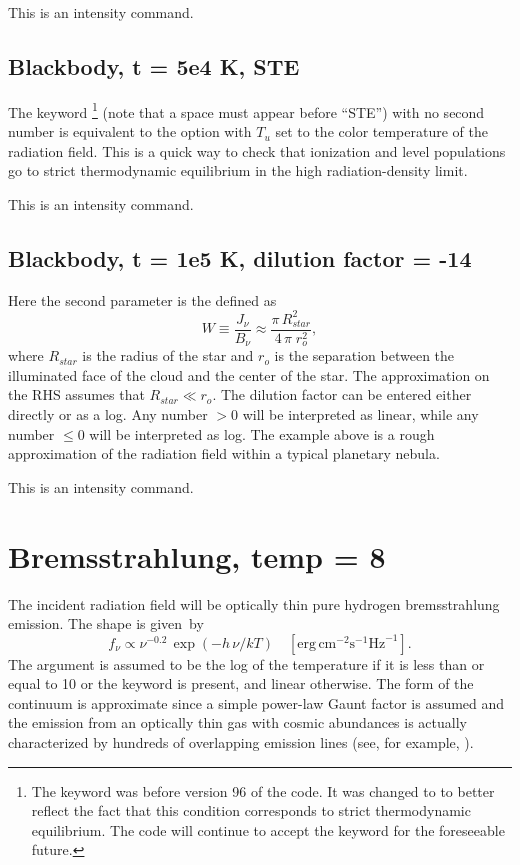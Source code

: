 This is an intensity command.

\subsection{Blackbody, t = 5e4 K, STE  }

The keyword \footnote{The keyword was  before version 96 of the code.  It was changed
to  to better reflect the fact that this condition corresponds to strict
thermodynamic equilibrium.
The code will continue to accept the  keyword
for the foreseeable future.}
(note that a space must appear before ``STE'') with no second number is
equivalent to the  option with $T_u$ set
to the color temperature
of the radiation field.
This is a quick way to check that ionization and
level populations go to strict thermodynamic equilibrium in the high
radiation-density limit.

This is an intensity command.

\subsection{Blackbody, t = 1e5 K, dilution factor = -14}

Here the second parameter is the 
 defined as
\begin{equation}
W \equiv \frac{{J_\nu  }}{{B_\nu  }} \approx \frac{{\pi \,R_{star}^2
}}{{4\,\pi \;r_o^2 }},%
\end{equation}
where $R_{star}$ is the radius of the star and $r_o$ is the separation
between the illuminated face of the cloud and the center of the star.
The approximation
on the RHS assumes that $R_{star} \ll r_o$.
The dilution factor can be entered
either directly or as a log. Any number $> 0$ will be interpreted as
linear, while any number $\leq 0$ will be interpreted as log.
The example above is a rough approximation of the radiation field within
a typical planetary nebula.

This is an intensity command.

\section{Bremsstrahlung, temp = 8}

The incident radiation field will be optically thin pure hydrogen bremsstrahlung
emission.
The shape is given~by
\begin{equation}
f_\nu   \propto \nu ^{ - 0.2} \,\exp \left( { - h\,\nu /kT} \right)\quad
[\mathrm{erg\, cm}^{-2} \mathrm{s}^{-1} \mathrm{Hz}^{-1}]. %
\end{equation}
The argument is assumed to be the log of the temperature if it is
less than or equal to 10 or the keyword  is present, and linear otherwise.
The form of the continuum is
approximate since a simple power-law Gaunt factor is assumed and
the emission
from an optically thin gas with cosmic abundances is
actually characterized
by hundreds of overlapping emission lines (see, for example, \citealp{Kato1976}).

